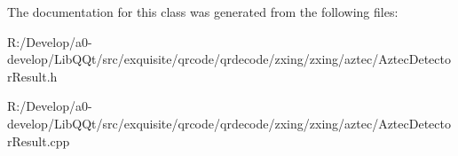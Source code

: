 The documentation for this class was generated from the following files\+:\begin{DoxyCompactItemize}
\item 
R\+:/\+Develop/a0-\/develop/\+Lib\+Q\+Qt/src/exquisite/qrcode/qrdecode/zxing/zxing/aztec/Aztec\+Detector\+Result.\+h\item 
R\+:/\+Develop/a0-\/develop/\+Lib\+Q\+Qt/src/exquisite/qrcode/qrdecode/zxing/zxing/aztec/Aztec\+Detector\+Result.\+cpp\end{DoxyCompactItemize}
